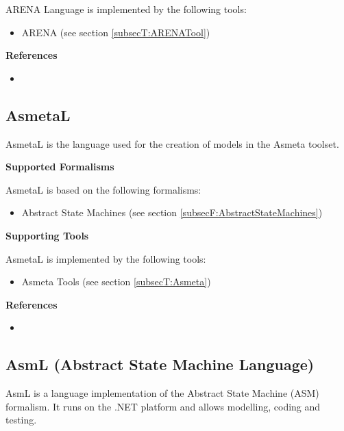 ARENA Language is implemented by the following tools:
\begin{itemize}
	\item ARENA (see section \ref{subsecT:ARENATool})
\end{itemize}


\textbf{References}
\begin{itemize}
	
\item {}
\end{itemize}



\subsection{AsmetaL}
\label{subsecL:AsmetaL}


AsmetaL is the language used for the creation of models in the Asmeta toolset.

\textbf{Supported Formalisms}

AsmetaL is based on the following formalisms:
\begin{itemize}
	\item Abstract State Machines (see section \ref{subsecF:AbstractStateMachines})
\end{itemize}


\textbf{Supporting Tools}

AsmetaL is implemented by the following tools:
\begin{itemize}
	\item Asmeta Tools (see section \ref{subsecT:Asmeta})
\end{itemize}


\textbf{References}
\begin{itemize}
	
\item {}
\end{itemize}



\subsection{AsmL (Abstract State Machine Language)}
\label{subsecL:AsmL}


AsmL is a language implementation of the Abstract State Machine (ASM) formalism. It runs on the .NET platform and allows modelling, coding and testing.

